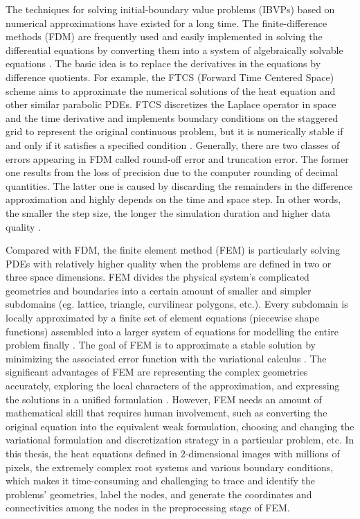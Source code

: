 The techniques for solving initial-boundary value problems (IBVPs)
based on numerical approximations have existed for a long time. The
finite-difference methods (FDM) are frequently used and easily
implemented in solving the differential equations by converting them
into a system of algebraically solvable equations
\cite{grossmann2007numerical}. The basic idea is to replace the
derivatives in the equations by difference quotients. For example, the
FTCS (Forward Time Centered Space) scheme
\cite{pletcher2012computational} aims to approximate the numerical
solutions of the heat equation and other similar parabolic PDEs. FTCS
discretizes the Laplace operator in space and the time derivative and
implements boundary conditions on the staggered grid to represent the
original continuous problem, but it is numerically stable if and only
if it satisfies a specified condition
\cite{pletcher2012computational}. Generally, there are two classes of
errors appearing in FDM called round-off error and truncation
error. The former one results from the loss of precision due to the
computer rounding of decimal quantities. The latter one is caused by
discarding the remainders in the difference approximation and highly
depends on the time and space step. In other words, the smaller the
step size, the longer the simulation duration and higher data quality
\cite{hoffman2018numerical}.


Compared with FDM, the finite element method (FEM) is particularly
solving PDEs with relatively higher quality when the problems are
defined in two or three space dimensions. FEM divides the physical
system's complicated geometries and boundaries into a certain amount
of smaller and simpler subdomains \cite{logan2011first} (eg. lattice,
triangle, curvilinear polygons, etc.). Every subdomain is locally
approximated by a finite set of element equations (piecewise shape
functions) assembled into a larger system of equations for modelling
the entire problem finally \cite{logan2011first}. The goal of FEM is
to approximate a stable solution by minimizing the associated error
function with the variational calculus \cite{logan2011first}. The
significant advantages of FEM are representing the complex geometries
accurately, exploring the local characters of the approximation, and
expressing the solutions in a unified formulation
\cite{reddy1993introduction}. However, FEM needs an amount of
mathematical skill that requires human involvement, such as converting
the original equation into the equivalent weak formulation, choosing
and changing the variational formulation and discretization strategy
in a particular problem, etc. In this thesis, the heat equations
defined in $2$-dimensional images with millions of pixels, the
extremely complex root systems and various boundary conditions, which
makes it time-consuming and challenging to trace and identify the
problems' geometries, label the nodes, and generate the coordinates
and connectivities among the nodes in the preprocessing stage of FEM.


